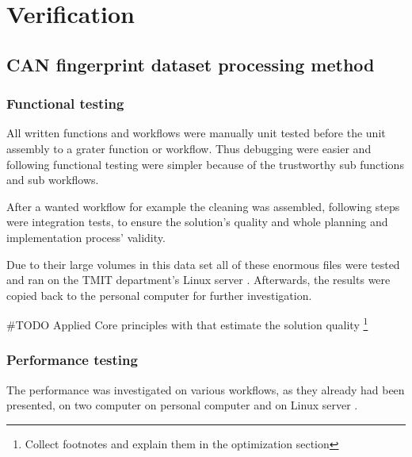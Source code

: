 \chapter{Verification}
\section{CAN fingerprint dataset processing method}
\subsection{Functional testing}
All written functions and workflows were manually unit tested before the unit assembly to a grater function or workflow. Thus debugging were easier and following functional testing were simpler because of the trustworthy sub functions and sub workflows.

After a wanted workflow for example the cleaning was assembled, following steps were integration tests, to ensure the solution's quality and whole planning and implementation process' validity.

Due to their large volumes in this data set all of these enormous files were tested and ran on the TMIT department's Linux server \cite{Batman}.
Afterwards, the results were copied back to the personal computer for further investigation.

\#TODO Applied Core principles with that estimate the solution quality
\footnote{Collect footnotes and explain them in the optimization section}
\subsection{Performance testing}
The performance was investigated on various workflows, as they already had been presented, on two computer on personal computer \cite{Latitude} and on Linux server \cite{Batman}.

